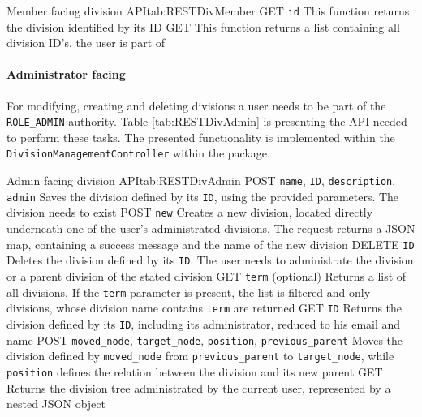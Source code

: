 \begin{RESTTable}{Member facing division API}{tab:RESTDivMember}
		{GET}
		{\texttt{id}}
		{This function returns the division identified by its ID}
		{GET}
		{}
		{This function returns a list containing all division ID's, the user is part of}
\end{RESTTable}

\paragraph{Administrator facing}
For modifying, creating and deleting divisions a user needs to be part of the \texttt{ROLE\_ADMIN} authority. Table \vref{tab:RESTDivAdmin} is presenting the \gls{API} needed to perform these tasks. The presented functionality is implemented within the \texttt{DivisionManagementController} within the  package.

\begin{RESTTable}{Admin facing division API}{tab:RESTDivAdmin}
		{POST}
		{\texttt{name}, \texttt{ID}, \texttt{description}, \texttt{admin}}
		{Saves the division defined by its \texttt{ID}, using the provided parameters. The division needs to exist}
		{POST} 
		{\texttt{new}}
		{Creates a new division, located directly underneath one of the user's administrated divisions. The request returns a JSON map, containing a success message and the name of the new division}
		{DELETE}
		{\texttt{ID}}
		{Deletes the division defined by its \texttt{ID}. The user needs to administrate the division or a parent division of the stated division}
		{GET}
		{\texttt{term} (optional)}
		{Returns a list of all divisions. If the \texttt{term} parameter is present, the list is filtered and only divisions, whose division name contains \texttt{term} are returned}
		{GET}
		{\texttt{ID}}
		{Returns the division defined by its \texttt{ID}, including its administrator, reduced to his email and name}
		{POST}
		{\texttt{moved\_node}, \texttt{target\_node}, \texttt{position}, \texttt{previous\_parent}}
		{Moves the division defined by \texttt{moved\_node} from \texttt{previous\_parent} to \texttt{target\_node}, while \texttt{position} defines the relation between the division and its new parent}
		{GET}
		{} 
		{Returns the division tree administrated by the current user, represented by a nested JSON object}
\end{RESTTable}

